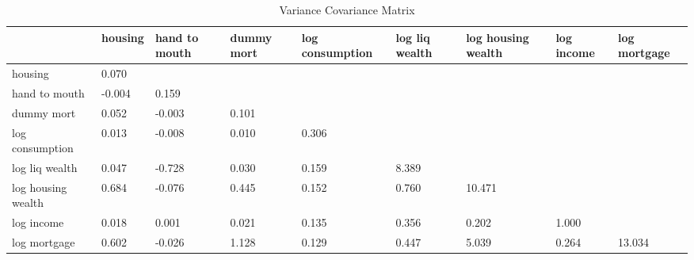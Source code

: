 \begin{table}[htbp]
\caption{\label{clabel} Variance Covariance Matrix}\centering\medskip
\begin{tabular}{lllllllll} \hline \hline
 & housing  & hand to mouth  & dummy mort  & log consumption  & log liq wealth  & log housing wealth  & log income  & log mortgage  \\  \hline 
housing &     0.070 \\  
hand to mouth &    -0.004 &     0.159 \\  
dummy mort &     0.052 &    -0.003 &     0.101 \\  
log consumption &     0.013 &    -0.008 &     0.010 &     0.306 \\  
log liq wealth &     0.047 &    -0.728 &     0.030 &     0.159 &     8.389 \\  
log housing wealth &     0.684 &    -0.076 &     0.445 &     0.152 &     0.760 &    10.471 \\  
log income &     0.018 &     0.001 &     0.021 &     0.135 &     0.356 &     0.202 &     1.000 \\  
log mortgage &     0.602 &    -0.026 &     1.128 &     0.129 &     0.447 &     5.039 &     0.264 &    13.034 \\  
\hline \hline \end{tabular}
\end{table}
